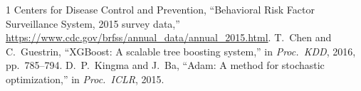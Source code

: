 \documentclass[10pt,conference,compsocconf,onecolumn]{IEEEtran}
\begin{document}

\begin{thebibliography}{1}
Centers for Disease Control and Prevention, ``Behavioral Risk Factor
Surveillance System, 2015 survey data,''
\url{https://www.cdc.gov/brfss/annual_data/annual_2015.html}.
T.~Chen and C.~Guestrin, ``XGBoost: A scalable tree boosting system,'' in
\emph{Proc.\ KDD}, 2016, pp.~785--794.
D.~P.~Kingma and J.~Ba, ``Adam: A method for stochastic optimization,'' in
\emph{Proc.\ ICLR}, 2015.
\end{thebibliography}
\end{document}
